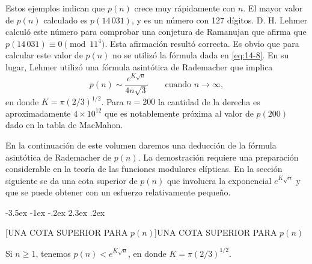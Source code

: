 \documentclass[12pt,a4paper]{book}
\makeatletter
\renewcommand\section{\@startsection{section}{1}{\z@}%
  {-3.5ex \@plus -1ex \@minus -.2ex}%
  {2.3ex \@plus .2ex}%
  {\normalfont\Large\bfseries\raggedright}}
\makeatother
\begin{document}
    Estos ejemplos indican que $p(n)$ crece muy rápidamente con $n$. El mayor valor de $p(n)$
    calculado es $p(14\,031)$, y es un número con 127 dígitos. D. H. Lehmer
    \cite{lehmer1936} calculó este número para comprobar una conjetura de Ramanujan que afirma
    que $p(14\,031)\equiv0\pmod{11^{4}}$. Esta afirmación resultó correcta. Es obvio que para
    calcular este valor de $p(n)$ no se utilizó la fórmula dada en \eqref{eq:14-8}. En su lugar,
    Lehmer utilizó una fórmula asintótica de Rademacher \cite{rademacher1937} que implica
    \begin{equation*}
        p(n)\sim\frac{e^{K\sqrt{n}}}{4n\sqrt{3}}\qquad\text{cuando }n\to\infty,
    \end{equation*}
    en donde $K=\pi(2/3)^{1/2}$. Para $n=200$ la cantidad de la derecha es aproximadamente
    $4\times10^{12}$ que es notablemente próxima al valor de $p(200)$ dado en la tabla de
    MacMahon.

    En la continuación de este volumen daremos una deducción de la fórmula asintótica de
    Rademacher de $p(n)$. La demostración requiere una preparación considerable en la teoría de
    las funciones modulares elípticas. En la sección siguiente se da una cota superior de $p(n)$
    que involucra la exponencial $e^{K\sqrt{n}}$ y que se puede obtener con un esfuerzo
    relativamente pequeño.

    \section[UNA COTA SUPERIOR PARA \texorpdfstring{$p(n)$}{p(n)}]{UNA COTA SUPERIOR PARA \texorpdfstring{$p(n)$}{p(n)}}

    \begin{teorema}\label{teo:14-5}
        Si $n\geq1$, tenemos $p(n)<e^{K\sqrt{n}}$, en donde $K=\pi(2/3)^{1/2}$.
    \end{teorema}
\end{document}
